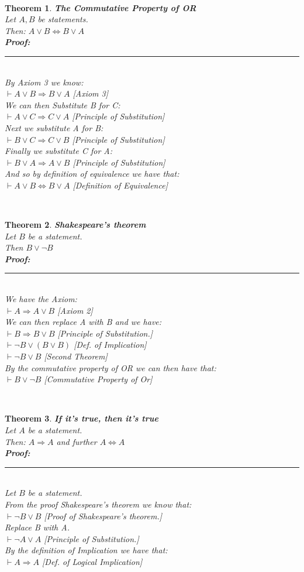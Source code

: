 \documentclass[12pt]{extarticle}
\theoremstyle{plain}
\newtheorem{thm}{Theorem}[section]
\theoremstyle{plain}
\theoremstyle{plain}
\theoremstyle{Definition}
\theoremstyle{Definition}
\theoremstyle{plain}
\newcommand{\cut}[0]{\noindent\framebox[\linewidth]{\rule{\linewidth}{2pt}}\\}
\newcommand{\prof}[0]{	\noindent \textbf{Proof:} \rule{500pt}{2pt} \\ }
\begin{document}
\cut
\begin{thm} \textbf{The Commutative Property of OR} \\
	Let $A,B$ be statements. \\
	Then: $A \lor B \Leftrightarrow B \lor A$ \\ 
	\prof
	By Axiom 3 we know: \\ 
	$\vdash A \lor B \Rightarrow B \lor A$ \hfill [Axiom 3] \\
	We can then Substitute B for C: \\
	$\vdash A \lor C \Rightarrow C \lor A$ \hfill [Principle of Substitution] \\
	Next we substitute A for B: \\ 
	$\vdash B \lor C \Rightarrow C \lor B$ \hfill [Principle of Substitution] \\
	Finally we substitute C for A: \\ 
	$\vdash B \lor A \Rightarrow A \lor B$ \hfill [Principle of Substitution] \\
	And so by definition of equivalence we have that: \\
	$\vdash A \lor B \Leftrightarrow B \lor A$ \hfill [Definition of Equivalence]
\end{thm}
\cut
\begin{thm} \textbf{Shakespeare's theorem} \\ 
	Let $B$ be a statement. \\
	Then $B \lor \lnot B$ \\ 
	\prof
	We have the Axiom: \\
	$\vdash A \Rightarrow A \lor B$ \hfill [Axiom 2] \\ 
	We can then replace A with B and  we have: \\ 
	$\vdash B \Rightarrow B \lor B$ \hfill [Principle of Substitution.] \\ 
	$\vdash \lnot B \lor (B \lor B)$ \hfill [Def. of Implication]\\ 
	$\vdash \lnot B \lor B$ \hfill [Second Theorem] \\ 
	By the commutative property of OR we can then have that: \\ 
	$\vdash B \lor \lnot B$ \hfill [Commutative Property of Or] 
\end{thm}
\cut
\begin{thm} \textbf{If it's true, then it's true} \\ 
	Let $A$ be a statement. \\ 
	Then: $A \Rightarrow A$ and further $A \Leftrightarrow A$ \\
	\prof
	Let $B$ be a statement. \\ 
	From the proof Shakespeare's theorem we know that: \\
	$\vdash \lnot B \lor B$ \hfill [Proof of Shakespeare's theorem.] \\ 
	Replace B with A. \\ 
	$\vdash \lnot A \lor A$ \hfill [Principle of Substitution.] \\
	By the definition of Implication we have that: \\ 
	$\vdash A \Rightarrow A$ \hfill [Def. of Logical Implication] 	
\end{thm}
\end{document}
